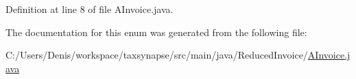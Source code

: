 Definition at line 8 of file A\+Invoice.\+java.



The documentation for this enum was generated from the following file\+:\begin{DoxyCompactItemize}
\item 
C\+:/\+Users/\+Denis/workspace/taxsynapse/src/main/java/\+Reduced\+Invoice/\hyperlink{_a_invoice_8java}{A\+Invoice.\+java}\end{DoxyCompactItemize}
